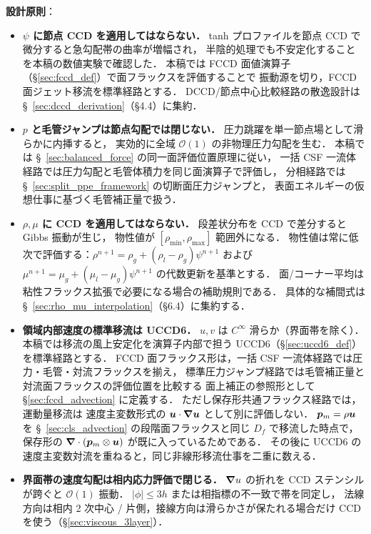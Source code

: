 \noindent\textbf{設計原則}：
\begin{itemize}
  \item \textbf{$\psi$ に節点 CCD を適用してはならない．}
        tanh プロファイルを節点 CCD で微分すると急勾配帯の曲率が増幅され，
        半陰的処理でも不安定化することを本稿の数値実験で確認した．
        本稿では FCCD 面値演算子（\S\ref{sec:fccd_def}）で面フラックスを評価することで
        振動源を切り，FCCD 面ジェット移流を標準経路とする．
        DCCD/節点中心比較経路の散逸設計は \S~\ref{sec:dccd_derivation}（§4.4）に集約．
  \item \textbf{$p$ と毛管ジャンプは節点勾配では閉じない．}
        圧力跳躍を単一節点場として滑らかに内挿すると，
        実効的に全域 $\mathcal{O}(1)$ の非物理圧力勾配を生む．
        本稿では §~\ref{sec:balanced_force} の同一面評価位置原理に従い，
        一括 CSF 一流体経路では圧力勾配と毛管体積力を同じ面演算子で評価し，
        分相経路では §~\ref{sec:split_ppe_framework} の切断面圧力ジャンプと，
        表面エネルギーの仮想仕事に基づく毛管補正量で扱う．
  \item \textbf{$\rho, \mu$ に CCD を適用してはならない．}
        段差状分布を CCD で差分すると Gibbs 振動が生じ，
        物性値が $[\rho_\text{min},\rho_\text{max}]$ 範囲外になる．
        物性値は常に低次で評価する：$\rho^{n+1} = \rho_g + (\rho_l-\rho_g)\psi^{n+1}$
        および $\mu^{n+1} = \mu_g + (\mu_l-\mu_g)\psi^{n+1}$ の代数更新を基準とする．
        面/コーナー平均は粘性フラックス拡張で必要になる場合の補助規則である．
        具体的な補間式は \S~\ref{sec:rho_mu_interpolation}（§6.4）に集約する．
  \item \textbf{領域内部速度の標準移流は UCCD6．}
        $u, v$ は $C^\infty$ 滑らか（界面帯を除く）．
        本稿では移流の風上安定化を演算子内部で担う
        UCCD6（\S\ref{sec:uccd6_def}）を標準経路とする．
        FCCD 面フラックス形は，一括 CSF 一流体経路では圧力・毛管・対流フラックスを揃え，
        標準圧力ジャンプ経路では毛管補正量と対流面フラックスの評価位置を比較する
        面上補正の参照形として \S\ref{sec:fccd_advection} に定義する．
        ただし保存形共通フラックス経路では，運動量移流は
        速度主変数形式の $\bm{u}\cdot\bm{\nabla}\bm{u}$ として別に評価しない．
        $\bm{p}_m=\rho\bm{u}$ を §~\ref{sec:cls_advection} の段階面フラックスと同じ
        $D_f$ で移流した時点で，保存形の
        $\bm{\nabla}\cdot(\bm{p}_m\otimes\bm{u})$ が既に入っているためである．
        その後に UCCD6 の速度主変数対流を重ねると，同じ非線形移流仕事を二重に数える．
  \item \textbf{界面帯の速度勾配は相内応力評価で閉じる．}
        $\bm{\nabla} u$ の折れを CCD ステンシルが跨ぐと $\mathcal{O}(1)$ 振動．
        $|\phi|\le 3h$ または相指標の不一致で帯を同定し，
        法線方向は相内 2 次中心 / 片側，接線方向は滑らかさが保たれる場合だけ
        CCD を使う（\S\ref{sec:viscous_3layer}）．
\end{itemize}

